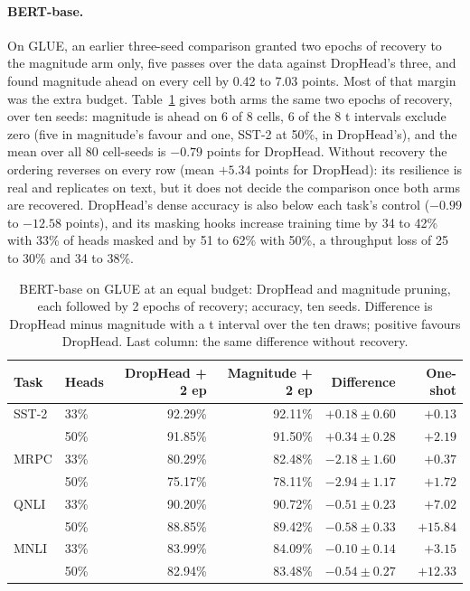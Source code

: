 \documentclass[11pt,a4paper]{article}
\begin{document}
\paragraph{BERT-base.} On GLUE, an earlier three-seed comparison granted two epochs of recovery to the magnitude arm only, five passes over the data against DropHead's three, and found magnitude ahead on every cell by 0.42 to 7.03 points. Most of that margin was the extra budget. Table~\ref{tab:bert} gives both arms the same two epochs of recovery, over ten seeds: magnitude is ahead on 6 of 8 cells, 6 of the 8 t intervals exclude zero (five in magnitude's favour and one, SST-2 at 50\%, in DropHead's), and the mean over all 80 cell-seeds is $-0.79$ points for DropHead. Without recovery the ordering reverses on every row (mean $+5.34$ points for DropHead): its resilience is real and replicates on text, but it does not decide the comparison once both arms are recovered. DropHead's dense accuracy is also below each task's control ($-0.99$ to $-12.58$ points), and its masking hooks increase training time by 34 to 42\% with 33\% of heads masked and by 51 to 62\% with 50\%, a throughput loss of 25 to 30\% and 34 to 38\%.

\begin{table}[t]
\centering
\caption{BERT-base on GLUE at an equal budget: DropHead and magnitude pruning, each followed by 2 epochs of recovery; accuracy, ten seeds. Difference is DropHead minus magnitude with a t interval over the ten draws; positive favours DropHead. Last column: the same difference without recovery.}
\label{tab:bert}
\begin{tabular}{llrrrr}
\toprule
Task & Heads & DropHead + 2 ep & Magnitude + 2 ep & Difference & One-shot \\
\midrule
SST-2 & 33\% & 92.29\% & 92.11\% & $+0.18 \pm 0.60$ & $+0.13$ \\
 & 50\% & 91.85\% & 91.50\% & $+0.34 \pm 0.28$ & $+2.19$ \\
MRPC & 33\% & 80.29\% & 82.48\% & $-2.18 \pm 1.60$ & $+0.37$ \\
 & 50\% & 75.17\% & 78.11\% & $-2.94 \pm 1.17$ & $+1.72$ \\
QNLI & 33\% & 90.20\% & 90.72\% & $-0.51 \pm 0.23$ & $+7.02$ \\
 & 50\% & 88.85\% & 89.42\% & $-0.58 \pm 0.33$ & $+15.84$ \\
MNLI & 33\% & 83.99\% & 84.09\% & $-0.10 \pm 0.14$ & $+3.15$ \\
 & 50\% & 82.94\% & 83.48\% & $-0.54 \pm 0.27$ & $+12.33$ \\
\bottomrule
\end{tabular}
\end{table}
\end{document}
